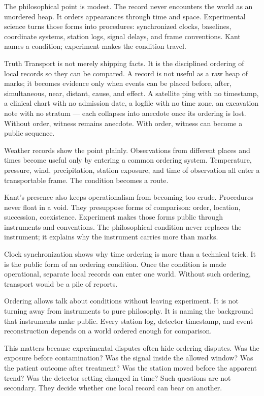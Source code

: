 The philosophical point is modest. The record never encounters the world as
an unordered heap. It orders appearances through time and space.
Experimental science turns those forms into procedures: synchronized
clocks, baselines, coordinate systems, station logs, signal delays, and
frame conventions. Kant names a condition; experiment makes the condition
travel.

Truth Transport is not merely shipping facts. It is the disciplined
ordering of local records so they can be compared. A record is not useful
as a raw heap of marks; it becomes evidence only when events can be placed
before, after, simultaneous, near, distant, cause, and effect. A
satellite ping with no timestamp, a clinical chart with no admission
date, a logfile with no time zone, an excavation note with no stratum ---
each collapses into anecdote once its ordering is lost. Without order,
witness remains anecdote. With order, witness can become a public
sequence.

Weather records show the point plainly. Observations from different places
and times become useful only by entering a common ordering system.
Temperature, pressure, wind, precipitation, station exposure, and time of
observation all enter a transportable frame. The condition becomes a route.

Kant's presence also keeps operationalism from becoming too crude.
Procedures never float in a void. They presuppose forms of comparison:
order, location, succession, coexistence. Experiment makes those forms
public through instruments and conventions. The philosophical condition
never replaces the instrument; it explains why the instrument carries more
than marks.

Clock synchronization shows why time ordering is more than a technical
trick. It is the public form of an ordering condition. Once the condition is made operational, separate local records
can enter one world. Without such ordering, transport would be a pile of
reports.

Ordering allows talk about conditions without leaving experiment. It is
not turning away from instruments to pure philosophy. It is naming the
background that instruments make public. Every station log, detector
timestamp, and event reconstruction depends on a world ordered enough for
comparison.

This matters because experimental disputes often hide ordering disputes.
Was the exposure before contamination? Was the signal inside the allowed
window? Was the patient outcome after treatment? Was the station moved
before the apparent trend? Was the detector setting changed in time? Such
questions are not secondary. They decide whether one local record can bear
on another.

